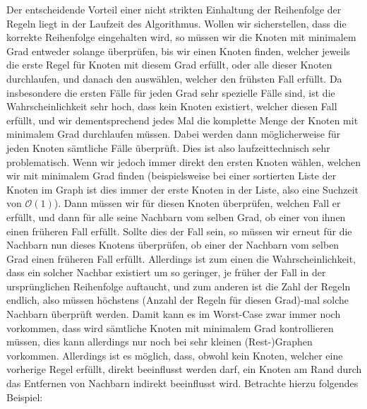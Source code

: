 \documentclass[12pt,onecolumn, notitlepage]{scrartcl}
\begin{document}
Der entscheidende Vorteil einer nicht strikten Einhaltung der Reihenfolge der Regeln liegt in der Laufzeit des Algorithmus. Wollen wir sicherstellen, dass die korrekte Reihenfolge eingehalten wird, so müssen wir die Knoten mit minimalem Grad entweder solange überprüfen, bis wir einen Knoten finden, welcher jeweils die erste Regel für Knoten mit diesem Grad erfüllt, oder alle dieser Knoten durchlaufen, und danach den auswählen, welcher den frühsten Fall erfüllt. Da insbesondere die ersten Fälle für jeden Grad sehr spezielle Fälle sind, ist die Wahrscheinlichkeit sehr hoch, dass kein Knoten existiert, welcher diesen Fall erfüllt, und wir dementsprechend jedes Mal die komplette Menge der Knoten mit minimalem Grad durchlaufen müssen. Dabei werden dann möglicherweise für jeden Knoten sämtliche Fälle überprüft. Dies ist also laufzeittechnisch sehr problematisch. Wenn wir jedoch immer direkt den ersten Knoten wählen, welchen wir mit minimalem Grad finden (beispielsweise bei einer sortierten Liste der Knoten im Graph ist dies immer der erste Knoten in der Liste, also eine Suchzeit von $\mathcal O(1)$). Dann müssen wir für diesen Knoten überprüfen, welchen Fall er erfüllt, und dann für alle seine Nachbarn vom selben Grad, ob einer von ihnen einen früheren Fall erfüllt. Sollte dies der Fall sein, so müssen wir erneut für die Nachbarn nun dieses Knotens überprüfen, ob einer der Nachbarn vom selben Grad einen früheren Fall erfüllt. Allerdings ist zum einen die Wahrscheinlichkeit, dass ein solcher Nachbar existiert um so geringer, je früher der Fall in der ursprünglichen Reihenfolge auftaucht, und zum anderen ist die Zahl der Regeln endlich, also müssen höchstens (Anzahl der Regeln für diesen Grad)-mal solche Nachbarn überprüft werden. Damit kann es im Worst-Case zwar immer noch vorkommen, dass wird sämtliche Knoten mit minimalem Grad kontrollieren müssen, dies kann allerdings nur noch bei sehr kleinen (Rest-)Graphen vorkommen. \newline
Allerdings ist es möglich, dass, obwohl kein Knoten, welcher eine vorherige Regel erfüllt, direkt beeinflusst werden darf, ein Knoten am Rand durch das Entfernen von Nachbarn indirekt beeinflusst wird. Betrachte hierzu folgendes Beispiel:\newline
\end{document}
